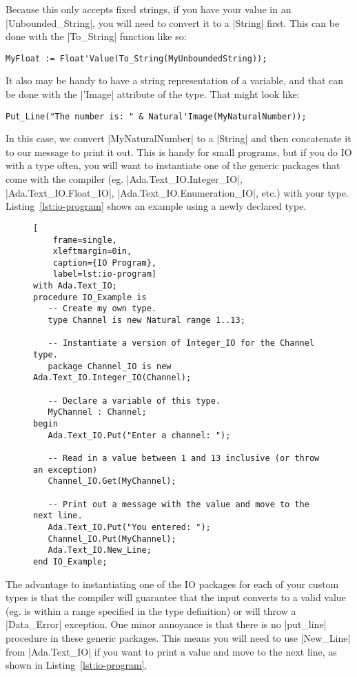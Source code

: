 \noindent Because this only accepts fixed strings, if you have your value in an
|Unbounded_String|, you will need to convert it to a |String| first. This can be done with the
|To_String| function like so:

\begin{lstlisting}
MyFloat := Float'Value(To_String(MyUnboundedString));
\end{lstlisting}

It also may be handy to have a string representation of a variable, and that can be done with
the |'Image| attribute of the type. That might look like:

\begin{lstlisting}
Put_Line("The number is: " & Natural'Image(MyNaturalNumber));
\end{lstlisting}

\noindent In this case, we convert |MyNaturalNumber| to a |String| and then concatenate it to
our message to print it out. This is handy for small programs, but if you do IO with a type
often, you will want to instantiate one of the generic packages that come with the compiler (eg.
|Ada.Text_IO.Integer_IO|, |Ada.Text_IO.Float_IO|, |Ada.Text_IO.Enumeration_IO|, etc.) with your
type. Listing~\ref{lst:io-program} shows an example using a newly declared type.

\begin{figure}[tbhp]
    \begin{lstlisting}[
    frame=single,
    xleftmargin=0in,
    caption={IO Program},
    label=lst:io-program]
with Ada.Text_IO;
procedure IO_Example is
   -- Create my own type.
   type Channel is new Natural range 1..13;

   -- Instantiate a version of Integer_IO for the Channel type.
   package Channel_IO is new Ada.Text_IO.Integer_IO(Channel);

   -- Declare a variable of this type.
   MyChannel : Channel;
begin
   Ada.Text_IO.Put("Enter a channel: ");

   -- Read in a value between 1 and 13 inclusive (or throw an exception)
   Channel_IO.Get(MyChannel);

   -- Print out a message with the value and move to the next line.
   Ada.Text_IO.Put("You entered: ");
   Channel_IO.Put(MyChannel);
   Ada.Text_IO.New_Line;
end IO_Example;
    \end{lstlisting}    
\end{figure}

The advantage to instantiating one of the IO packages for each of your custom types is that the
compiler will guarantee that the input converts to a valid value (eg. is within a range
specified in the type definition) or will throw a |Data_Error| exception. One minor annoyance is
that there is no |put_line| procedure in these generic packages. This means you will need to use
|New_Line| from |Ada.Text_IO| if you want to print a value and move to the next line, as shown
in Listing~\ref{lst:io-program}.
